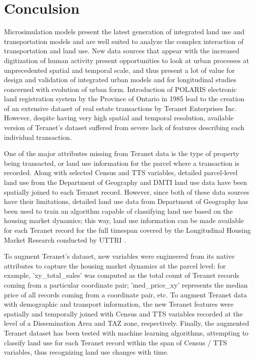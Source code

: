 \chapter{Conculsion} \label{ch:conclusion}

Microsimulation models present the latest generation of integrated land use and transportation models and are well suited to analyze the complex interaction of transportation and land use.
New data sources that appear with the increased digitization of human activity present opportunities to look at urban processes at unprecedented spatial and temporal scale, and thus present a lot of value for design and validation of integrated urban models and for longitudinal studies concerned with evolution of urban form.
Introduction of POLARIS electronic land registration system by the Province of Ontario in 1985 lead to the creation of an extensive dataset of real estate transactions by Teranet Enterprises Inc.
However, despite having very high spatial and temporal resolution, available version of Teranet's dataset suffered from severe lack of features describing each individual transaction.

One of the major attributes missing from Teranet data is the type of property being transacted, or land use information for the parcel where a transaction is recorded.
Along with selected Census and TTS variables, detailed parcel-level land use from the Department of Geography and DMTI land use data have been spatially joined to each Teranet record.
However, since both of these data sources have their limitations, detailed land use data from Department of Geography has been used to train an algorithm capable of classifying land use based on the housing market dynamics;
this way, land use information can be made available for each Teranet record for the full timespan covered by the Longitudinal Housing Market Research conducted by UTTRI .

To augment Teranet's dataset, new variables were engineered from its native attributes to capture the housing market dynamics at the parcel level:
for example, 'xy\_total\_sales' was computed as the total count of Teranet records coming from a particular coordinate pair;
'med\_price\_xy' represents the median price of all records coming from a coordinate pair, etc.
To augment Teranet data with demographic and transport information, the new Teranet features were spatially and temporally joined with Census and TTS variables recorded at the level of a Dissemination Area and TAZ zone, respectively.
Finally, the augmented Teranet dataset has been tested with machine learning algorithms, attempting to classify land use for each Teranet record within the span of Census / TTS variables, thus recognizing land use changes with time.

